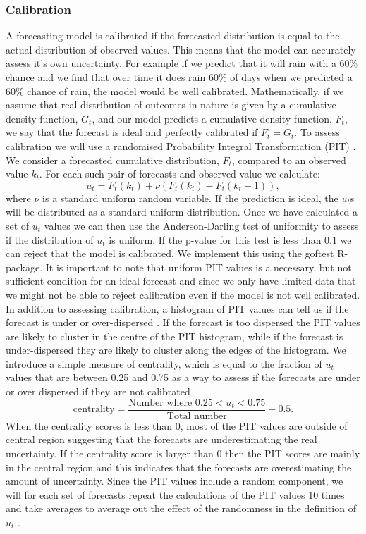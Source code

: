 \documentclass[12pt]{article}
\begin{document}
\subsubsection{Calibration}
A forecasting model is calibrated if the forecasted distribution is equal to the actual distribution of observed values. This means that the model can accurately assess it's own uncertainty. For example if we predict that it will rain with a 60\% chance and we find that over time it does rain 60\% of days when we predicted a 60\% chance of rain, the model would be well calibrated. Mathematically, if we assume that real distribution of outcomes in nature is given by a cumulative density function, $G_t$, and our model predicts a cumulative density function, $F_t$, we say that the forecast is ideal and perfectly calibrated if $F_t=G_t$. To assess calibration we will use a randomised Probability Integral Transformation (PIT) \cite{czadoPredictiveModelAssessment2009a}. We consider a forecasted cumulative distribution, $F_t$, compared to an observed value $k_t$. For each such pair of forecasts and observed value we calculate:
\[ u_t = F_t(k_t) + \nu (F_t(k_t) - F_t(k_t -1)),\]
where $\nu$ is a standard uniform random variable. If the prediction is ideal, the $u_t$s will be distributed as a standard uniform distribution. Once we have calculated a set of $u_t$ values we can then use the Anderson-Darling test of uniformity to assess if the distribution of $u_t$ is uniform. If the p-value for this test is less than 0.1 we can reject that the model is calibrated. We implement this using the goftest \cite{farawayGoftestClassicalGoodnessofFit2017} R-package. It is important to note that uniform PIT values is a necessary, but not sufficient condition for an ideal forecast and since we only have limited data that we might not be able to reject calibration even if the model is not well calibrated. In addition to assessing calibration, a histogram of PIT values can tell us if the forecast is under or over-dispersed \cite{czadoPredictiveModelAssessment2009a}. If the forecast is too dispersed the PIT values are likely to cluster in the centre of the PIT histogram, while if the forecast is under-dispersed they are likely to cluster along the edges of the histogram. We introduce a simple measure of centrality, which is equal to the fraction of $u_t$ values that are between 0.25 and 0.75 as a way to assess if the forecasts are under or over dispersed if they are not calibrated
\[\text{centrality} = \frac{\text{Number where }0.25 < u_t < 0.75}{\text{Total number}} - 0.5.\]
When the centrality scores is less than 0, most of the PIT values are outside of central region suggesting that the forecasts are underestimating the real uncertainty.  If the centrality score is larger than 0 then the PIT scores are mainly in the central region and this indicates that the forecasts are overestimating the amount of uncertainty. Since the PIT values include a random component, we will for each set of forecasts repeat the calculations of the PIT values 10 times and take averages to average out the effect of the randomness in the definition of $u_t$ \cite{funkAssessingPerformanceRealtime2019}. 
\end{document}
